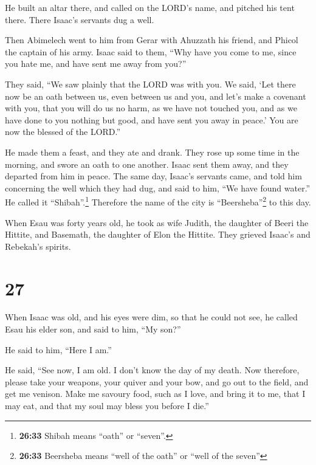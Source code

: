  He built an altar there, and called on the LORD's name,
and pitched his tent there. There Isaac's servants dug a well.

 Then Abimelech went to him from Gerar with Ahuzzath his
friend, and Phicol the captain of his army.  Isaac said
to them, ``Why have you come to me, since you hate me, and have sent me
away from you?''

 They said, ``We saw plainly that the LORD was with you.
We said, `Let there now be an oath between us, even between us and you,
and let's make a covenant with you,  that you will do us
no harm, as we have not touched you, and as we have done to you nothing
but good, and have sent you away in peace.' You are now the blessed of
the LORD.''

 He made them a feast, and they ate and drank.
 They rose up some time in the morning, and swore an oath
to one another. Isaac sent them away, and they departed from him in
peace.  The same day, Isaac's servants came, and told him
concerning the well which they had dug, and said to him, ``We have found
water.''  He called it ``Shibah''.\footnote{\textbf{26:33}
  Shibah means ``oath'' or ``seven''.} Therefore the name of the city is
``Beersheba''\footnote{\textbf{26:33} Beersheba means ``well of the
  oath'' or ``well of the seven''} to this day.

 When Esau was forty years old, he took as wife Judith,
the daughter of Beeri the Hittite, and Basemath, the daughter of Elon
the Hittite.  They grieved Isaac's and Rebekah's spirits.

\hypertarget{section-26}{%
\section{27}\label{section-26}}

 When Isaac was old, and his eyes were dim, so that he
could not see, he called Esau his elder son, and said to him, ``My
son?''

He said to him, ``Here I am.''

 He said, ``See now, I am old. I don't know the day of my
death.  Now therefore, please take your weapons, your
quiver and your bow, and go out to the field, and get me venison.
 Make me savoury food, such as I love, and bring it to me,
that I may eat, and that my soul may bless you before I die.''

